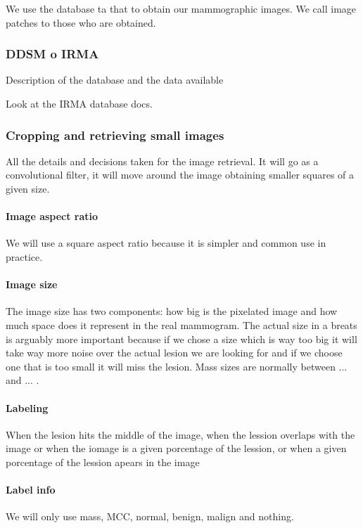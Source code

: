 We use the database ta that to obtain our mammographic images. We call image patches to those who are obtained.

\subsubsection{DDSM o IRMA}
Description of the database and the data available


Look at the IRMA database docs.

\subsubsection{Cropping and retrieving small images}
All the details and decisions taken for the image retrieval. It will go as a convolutional filter, it will move around the image obtaining smaller squares of a given size.

\paragraph{Image aspect ratio}
	We will use a square aspect ratio because it is simpler and common use in practice. 

\paragraph{Image size}
	The image size has two components: how big is the pixelated image and how much space does it represent in the real mammogram. The actual size in a breats is arguably more important because if we chose a size which is way too big it will take way more noise over the actual lesion we are looking for and if we choose one that is too small it will miss the lesion. Mass sizes are normally between ... and ... \cite{somebody}.

\paragraph{Labeling}
When the lesion hits the middle of the image, when the lession overlaps with the image or when the iomage is a given porcentage of the lession, or when a given porcentage of the lession apears in the image

\paragraph{Label info}
We will only use mass, MCC, normal, benign, malign and nothing.

